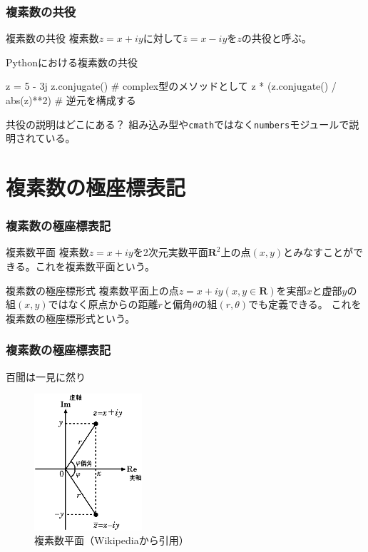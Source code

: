\documentclass[dvipdfmx,11pt,notheorems]{beamer}
\theoremstyle{definition}
\begin{document}
\begin{frame}[fragile]\frametitle{複素数の共役}

\begin{block}{複素数の共役}
複素数$z=x + iy$に対して$\bar{z}=x -iy$を$z$の共役と呼ぶ。
\end{block}

\begin{exampleblock}{Pythonにおける複素数の共役}
\begin{pyconsole}
z = 5 - 3j
z.conjugate()  # complex型のメソッドとして
z * (z.conjugate() / abs(z)**2)  # 逆元を構成する
\end{pyconsole}
\end{exampleblock}

\begin{alertblock}{共役の説明はどこにある？}
組み込み型や\texttt{cmath}ではなく\texttt{numbers}モジュールで説明されている。
\end{alertblock}

\end{frame}

\section{複素数の極座標表記}

\begin{frame}\frametitle{複素数の極座標表記}

\begin{block}{複素数平面}
複素数$z=x + iy$を2次元実数平面$\mathbf{R}^{2}$上の点$(x, y)$とみなすことができる。これを複素数平面という。
\end{block}

\begin{block}{複素数の極座標形式}
複素数平面上の点$z=x+iy (x, y \in \mathbf{R})$を実部$x$と虚部$y$の組$(x, y)$ではなく原点からの距離$r$と偏角$\theta $の組$(r, \theta )$でも定義できる。
これを複素数の極座標形式という。
\end{block}

\end{frame}

\begin{frame}\frametitle{複素数の極座標表記}

\begin{block}{百聞は一見に然り}
\begin{figure}
  \centering
  \includegraphics[width=4cm]{complex_plane.png}
  \caption{複素数平面（Wikipediaから引用）}
\end{figure}
\end{block}
\end{frame}
\end{document}
